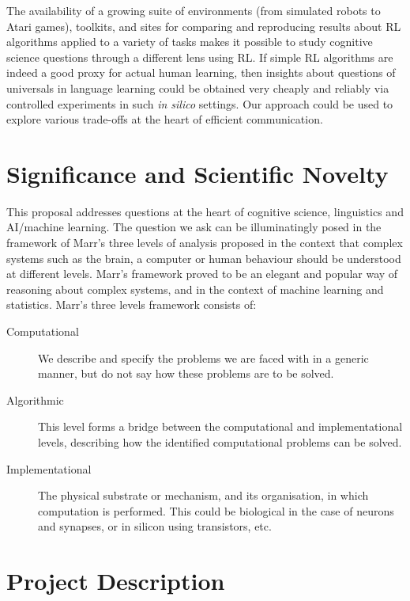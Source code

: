 \documentclass{article}
\begin{document}
The availability of a growing suite of environments (from simulated robots to Atari games), toolkits, and sites for comparing and reproducing results about RL algorithms applied to a variety of tasks makes it possible to study cognitive science questions through a different lens using RL. If simple RL algorithms are indeed a good proxy for actual human learning, then insights about questions of universals in language learning could be obtained very cheaply and reliably via controlled experiments in such \emph{in silico} settings. Our approach could be used to explore various trade-offs at the heart of efficient communication. 


\section{Significance and Scientific Novelty}
This proposal addresses questions at the heart of cognitive science, linguistics and AI/machine learning. The question we ask can be illuminatingly posed in the framework of Marr's three levels of analysis \cite{Marr82} proposed in the context that complex systems such as the brain, a computer or human behaviour should be understood at different levels. Marr's framework proved to be an elegant and popular way of reasoning about complex systems, and in the context of machine learning and statistics. Marr's three levels framework consists of:
\begin{description}
\item[Computational]
We describe and specify the problems we are faced with in a generic manner, but do not say how these problems are to be solved. 
\item[Algorithmic]
This level forms a bridge between the computational and implementational levels, describing how  the identified computational problems can be solved. 
\item[Implementational]
The physical substrate or mechanism, and its organisation, in which computation is performed. This could be biological in the case of neurons and synapses, or in silicon using transistors, etc.
\end{description}

\section{Project Description}
\end{document}
